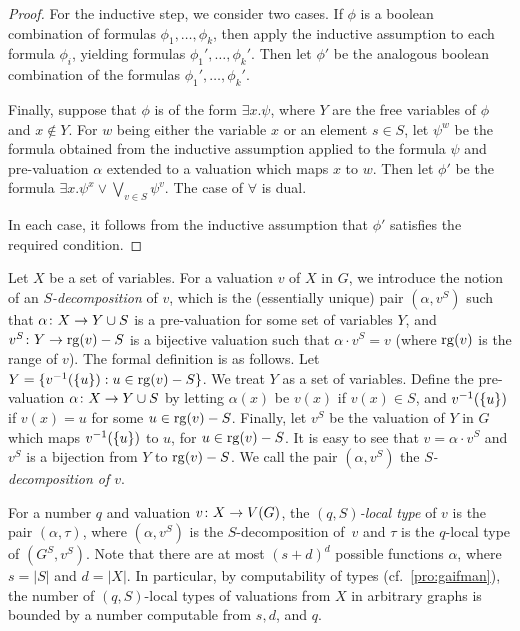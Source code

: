 \begin{proof}
For the inductive step, we consider two cases.
If $\phi$ is a boolean combination of formulas $\phi_1,\ldots,\phi_k$, then 
apply the inductive assumption to each formula $\phi_i$,
yielding formulas $\phi_1',\ldots,\phi_k'$. Then let $\phi'$ be the analogous boolean combination of the formulas $\phi_1',\ldots,\phi_k'$.

Finally, suppose that $\phi$ is of the form $\exists x.\psi$, where   $Y$ are the free variables of $\phi$ and $x\not \in Y$.
 For $w$ being either the variable $x$ 
or an element $s\in S$, 
let $\psi^w$ be the formula obtained from the inductive assumption applied to the formula $\psi$ 
and pre-valuation $\alpha$ extended to a valuation which maps  $x$ to $w$. 
Then let $\phi'$
be the formula $\exists x.\psi^x \lor \bigvee_{v\in S}\psi^v$.
The case of $\forall$ is dual.

In each case, it follows from the inductive assumption that $\phi'$ 
satisfies the required condition.
\end{proof}



Let $X$ be a set of variables.
For a valuation  $v$ of $X$ in $G$, we introduce the notion of an \emph{$S$-decomposition} of $v$,  
which is the (essentially unique) pair $(\alpha,v^S)$
such that $\alpha\colon X\to Y\cup S$ is a pre-valuation
for some set of variables $Y$,
and $v^S\colon Y\to \mathrm{rg}(v)-S$ is a bijective valuation such that 
$\alpha\cdot v^S=v$ (where $\mathrm{rg}(v)$ is the range of $v$). The formal definition is as follows.
Let $Y=\{v^{-1}(\{u\}): u\in \mathrm{rg}(v)-S\}$. We treat $Y$ as a set of variables. 
Define the pre-valuation $\alpha\colon X\to Y\cup S$
by letting $\alpha(x)$ be $v(x)$ if $v(x)\in S$,
and $v^{-1}(\{u\})$ if $v(x)=u$ for some $u\in \mathrm{rg}(v)-S$.
Finally, let $v^S$ be the valuation of $Y$ in $G$ which
maps  $v^{-1}(\{u\})$ to $u$, for $u\in \mathrm{rg}(v)-S$.
It is easy to see that $v=\alpha\cdot v^S$ and $v^S$ is a bijection from $Y$ 
to $\mathrm{rg}(v)-S$. We call the pair $(\alpha,v^S)$ the \emph{$S$-decomposition of $v$}.



For a number $q$ and valuation $v\colon X \to V(G)$, the \emph{$(q,S)$-local type} of $v$ 
is the pair $(\alpha,\tau)$,
where $(\alpha,v^S)$ is the $S$-decomposition of~$v$
and $\tau$ is the $q$-local type of   $(G^S,v^S)$.
Note that there are at most  $(s+d)^d$ possible functions $\alpha$, where $s=|S|$ and $d=|X|$. In particular, by computability of types (cf.~\cref{pro:gaifman}), 
the number of $(q,S)$-local types of valuations from $X$
in arbitrary graphs is bounded by 
a number computable from $s,d$, and $q$.





